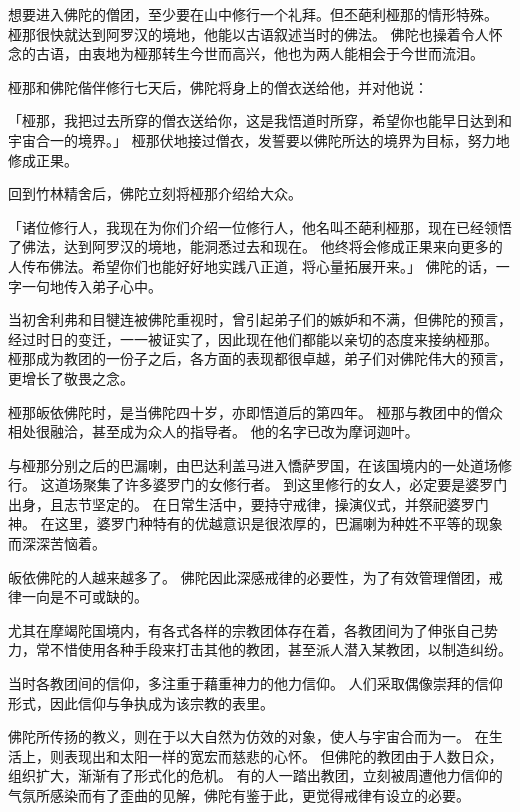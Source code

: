 \documentclass[twoside,openany]{book}
\begin{document}
想要进入佛陀的僧团，至少要在山中修行一个礼拜。但丕葩利\textperiodcentered 桠那的情形特殊。
桠那很快就达到阿罗汉的境地，他能以古语叙述当时的佛法。
佛陀也操着令人怀念的古语，由衷地为桠那转生今世而高兴，他也为两人能相会于今世而流泪。

桠那和佛陀偕伴修行七天后，佛陀将身上的僧衣送给他，并对他说：

「桠那，我把过去所穿的僧衣送给你，这是我悟道时所穿，希望你也能早日达到和宇宙合一的境界。」
桠那伏地接过僧衣，发誓要以佛陀所达的境界为目标，努力地修成正果。

回到竹林精舍后，佛陀立刻将桠那介绍给大众。

「诸位修行人，我现在为你们介绍一位修行人，他名叫丕葩利\textperiodcentered 桠那，现在已经领悟了佛法，达到阿罗汉的境地，能洞悉过去和现在。
他终将会修成正果来向更多的人传布佛法。希望你们也能好好地实践八正道，将心量拓展开来。」
佛陀的话，一字一句地传入弟子心中。

当初舍利弗和目犍连被佛陀重视时，曾引起弟子们的嫉妒和不满，但佛陀的预言，经过时日的变迁，一一被证实了，因此现在他们都能以亲切的态度来接纳桠那。
桠那成为教团的一份子之后，各方面的表现都很卓越，弟子们对佛陀伟大的预言，更增长了敬畏之念。

桠那皈依佛陀时，是当佛陀四十岁，亦即悟道后的第四年。
桠那与教团中的僧众相处很融洽，甚至成为众人的指导者。
他的名字已改为摩诃迦叶。

与桠那分别之后的巴漏喇，由巴达利盖马进入憍萨罗国，在该国境内的一处道场修行。
这道场聚集了许多婆罗门的女修行者。
到这里修行的女人，必定要是婆罗门出身，且志节坚定的。
在日常生活中，要持守戒律，操演仪式，并祭祀婆罗门神。
在这里，婆罗门种特有的优越意识是很浓厚的，巴漏喇为种姓不平等的现象而深深苦恼着。

皈依佛陀的人越来越多了。
%
%
佛陀因此深感戒律的必要性，为了有效管理僧团，戒律一向是不可或缺的。

尤其在摩竭陀国境内，有各式各样的宗教团体存在着，各教团间为了伸张自己势力，常不惜使用各种手段来打击其他的教团，甚至派人潜入某教团，以制造纠纷。

当时各教团间的信仰，多注重于藉重神力的他力信仰。
人们采取偶像崇拜的信仰形式，因此信仰与争执成为该宗教的表里。

佛陀所传扬的教义，则在于以大自然为仿效的对象，使人与宇宙合而为一。
在生活上，则表现出和太阳一样的宽宏而慈悲的心怀。
但佛陀的教团由于人数日众，组织扩大，渐渐有了形式化的危机。
有的人一踏出教团，立刻被周遭他力信仰的气氛所感染而有了歪曲的见解，佛陀有鉴于此，更觉得戒律有设立的必要。
\end{document}
